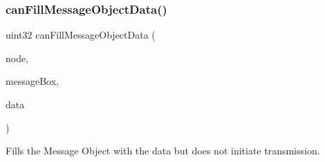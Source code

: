 \subsubsection{\texorpdfstring{can\+Fill\+Message\+Object\+Data()}{canFillMessageObjectData()}}
{\footnotesize\ttfamily uint32 can\+Fill\+Message\+Object\+Data (\begin{DoxyParamCaption}\item[{\mbox{\hyperlink{reg__can_8h_a54ace0879c28a425474845a63d662c05}{can\+B\+A\+S\+E\+\_\+t}} $\ast$}]{node,  }\item[{uint32}]{message\+Box,  }\item[{const uint8 $\ast$}]{data }\end{DoxyParamCaption})}



Fills the Message Object with the data but does not initiate transmission. 


